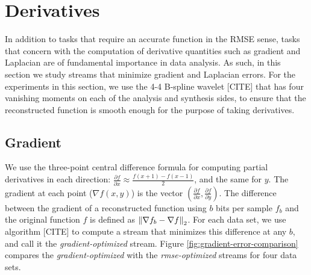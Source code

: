 \section{Derivatives}

In addition to tasks that require an accurate function in the RMSE sense, tasks that concern with
the computation of derivative quantities such as gradient and Laplacian are of fundamental
importance in data analysis. As such, in this section we study streams that minimize gradient and
Laplacian errors. For the experiments in this section, we use the 4-4 B-spline wavelet [CITE] that
has four vanishing moments on each of the analysis and synthesis sides, to ensure that the
reconstructed function is smooth enough for the purpose of taking derivatives.

\subsection{Gradient}

We use the three-point central difference formula for computing partial derivatives in each
direction: $\frac{\partial f}{\partial x}\approx \frac{f(x+1)-f(x-1)}{2}$, and the same for $y$. The
gradient at each point ($\nabla f(x,y)$) is the vector $(\frac{\partial f}{\partial
x},\frac{\partial f}{\partial y})$. The difference between the gradient of a reconstructed function
using $b$ bits per sample $f_b$ and the original function $f$ is defined as $\left\lVert\nabla f_b-\nabla
f\right\rVert_2$. For each data set, we use algorithm [CITE] to compute a stream that minimizes this difference
at any $b$, and call it the \emph{gradient-optimized} stream. Figure
\ref{fig:gradient-error-comparison} compares the \emph{gradient-optimized} with the
\emph{rmse-optimized} streams for four data sets.

